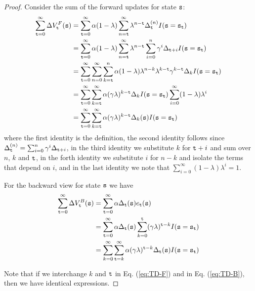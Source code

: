 \begin{proof}
Consider the sum of the forward updates for state ${\tt s}$:
\begin{align}
\sum_{\ttime=0}^{\infty } \Delta V^F_\ttime (\state)&=
\sum_{\ttime=0}^{\infty} \alpha
(1-\lambda) \sum_{n=\ttime}^{\infty} \lambda^{n-\ttime}\Delta_\ttime^{(n)} I(\state=\state_\ttime)\nonumber\\
%
&= \sum_{\ttime=0}^{\infty}  \alpha
(1-\lambda) \sum_{n=\ttime}^{\infty} \lambda^{n-\ttime}\sum_{i=0}^n \discount^i \Delta_{\ttime+i} I(\state=\state_\ttime)\nonumber\\
%
&=\sum_{\ttime=0}^\infty \sum_{n=0}^\infty \sum_{k=\ttime}^n \alpha
(1-\lambda)
\lambda^{n-k}\lambda^{k-\ttime}\discount^{k-\ttime}\Delta_k I(\state=\state_\ttime)\nonumber\\
%
&=\sum_{\ttime=0}^\infty \sum_{k=\ttime}^\infty \alpha
(\discount\lambda)^{k-\ttime}\Delta_k I(\state=\state_\ttime) \sum_{i=0}^\infty (1-\lambda)\lambda^{i}\nonumber\\
%
&= \sum_{\ttime=0}^\infty \sum_{k=\ttime}^\infty \alpha
(\discount\lambda)^{k-\ttime} \Delta_k(\state)
I(\state=\state_\ttime) \label{eq:TD-F}
\end{align}
where the first identity is the definition, the second identity
follows since $\Delta_{\tt t}^{(n)}=\sum_{i=0}^n\gamma^i
\Delta_{{\tt t}+i}$, in the third identity we substitute $k$ for
${\tt t}+i$ and sum over $n$, $k$ and ${\tt t}$, in the forth identity we
substitute $i$ for $n-k$ and isolate the terms that depend on $i$,
and in the last identity we note that $\sum_{i=0}^\infty
(1-\lambda)\lambda^{i}=1$.

For the backward view for state ${\tt s}$ we have
\begin{align}
\sum_{{\tt t}=0}^{\infty } \Delta V^B_{\tt t} ({\tt s})&=\sum_{{\tt t}=0}^{\infty} \alpha
\Delta_{\tt t}({\tt s}) e_{{\tt t}}({\tt s})\nonumber\\
&= \sum_{{\tt t}=0}^{\infty} \alpha
\Delta_{\tt t}({\tt s}) \sum_{k=0}^{\tt t} (\gamma\lambda)^{{\tt t}-k} I({\tt s}={\tt s}_{\tt t})\nonumber\\
&= \sum_{k=0}^\infty \sum_{{\tt t}=k}^\infty \alpha
(\gamma\lambda)^{{\tt t}-k}\Delta_{\tt t}({\tt s})I({\tt s}={\tt s}_{\tt t})
\label{eq:TD-B}
\end{align}

Note that if we interchange $k$ and ${\tt t}$ in Eq. (\ref{eq:TD-F})
and in Eq. (\ref{eq:TD-B}), then we have identical expressions.
\end{proof}

